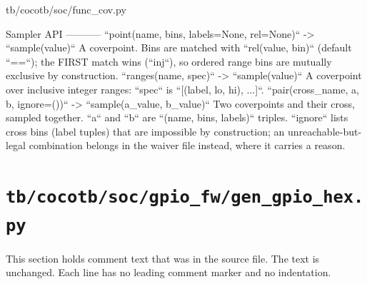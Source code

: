 \begin{relocated}{tb/cocotb/soc/func_cov.py}
\begin{textblock}
Sampler API
-----------
``point(name, bins, labels=None, rel=None)`` -> ``sample(value)``
A coverpoint.  Bins are matched with ``rel(value, bin)`` (default ``==``); the FIRST match
wins (``inj``), so ordered range bins are mutually exclusive by construction.
``ranges(name, spec)`` -> ``sample(value)``
A coverpoint over inclusive integer ranges: ``spec`` is ``[(label, lo, hi), ...]``.
``pair(cross_name, a, b, ignore=())`` -> ``sample(a_value, b_value)``
Two coverpoints and their cross, sampled together.  ``a`` and ``b`` are
``(name, bins, labels)`` triples.  ``ignore`` lists cross bins (label tuples) that are
impossible by construction; an unreachable-but-legal combination belongs in the waiver file
instead, where it carries a reason.
\end{textblock}

\end{relocated}

\section{\texttt{tb/cocotb/soc/gpio\_fw/gen\_gpio\_hex.py}}\label{tm:suite:soc-gpio-fw-gen-gpio-hex}

This section holds comment text that was in the source file. The text is unchanged. Each line has no leading comment marker and no indentation.

